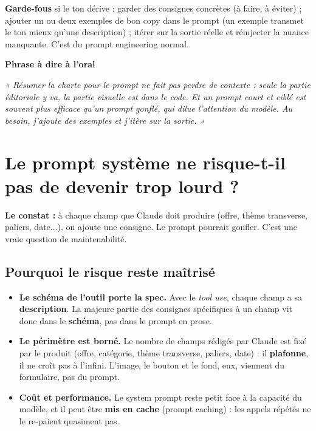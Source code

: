 \documentclass[11pt,a4paper]{article}
\newcommand{\phrasea}[1]{%
  \begin{phrasebox}
  {\bfseries\color{gefblue}\textsf{Phrase à dire à l'oral}}\par\smallskip
  \itshape #1
  \end{phrasebox}%
}
\begin{document}
\textbf{Garde-fous} si le ton dérive : garder des consignes concrètes (à faire, à
éviter) ; ajouter un ou deux exemples de bon copy dans le prompt (un exemple
transmet le ton mieux qu'une description) ; itérer sur la sortie réelle et
réinjecter la nuance manquante. C'est du prompt engineering normal.

\phrasea{« Résumer la charte pour le prompt ne fait pas perdre de contexte : seule
la partie éditoriale y va, la partie visuelle est dans le code. Et un prompt court
et ciblé est souvent plus efficace qu'un prompt gonflé, qui dilue l'attention du
modèle. Au besoin, j'ajoute des exemples et j'itère sur la sortie. »}

\section{Le prompt système ne risque-t-il pas de devenir trop lourd ?}

\textbf{Le constat :} à chaque champ que Claude doit produire (offre, thème transverse,
paliers, date...), on ajoute une consigne. Le prompt pourrait gonfler. C'est une vraie
question de maintenabilité.

\subsection{Pourquoi le risque reste maîtrisé}
\begin{itemize}[leftmargin=1.4em]
  \item \textbf{Le schéma de l'outil porte la spec.} Avec le \emph{tool use}, chaque
        champ a sa \textbf{description}. La majeure partie des consignes spécifiques à
        un champ vit donc dans le \textbf{schéma}, pas dans le prompt en prose.
  \item \textbf{Le périmètre est borné.} Le nombre de champs rédigés par Claude est fixé
        par le produit (offre, catégorie, thème transverse, paliers, date) : il
        \textbf{plafonne}, il ne croît pas à l'infini. L'image, le bouton et le fond, eux,
        viennent du formulaire, pas du prompt.
  \item \textbf{Coût et performance.} Le system prompt reste petit face à la capacité
        du modèle, et il peut être \textbf{mis en cache} (prompt caching) : les appels
        répétés ne le re-paient quasiment pas.
\end{itemize}
\end{document}

